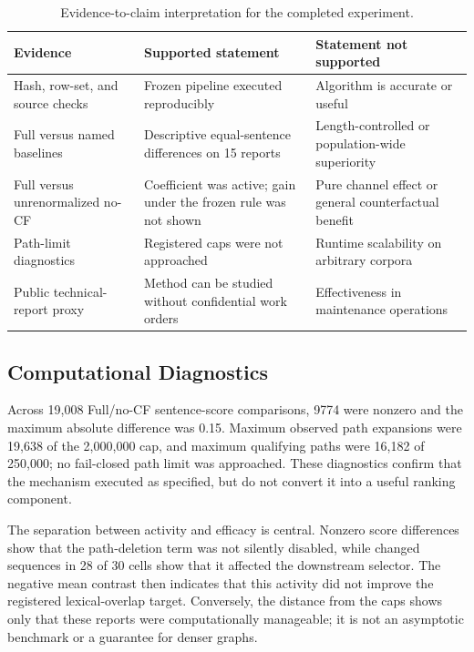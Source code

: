 \documentclass[applsci,article,submit,moreauthors]{Definitions/mdpi}
\begin{document}
\begin{table}[H]
\caption{Evidence-to-claim interpretation for the completed experiment.}
\label{tab:evidence-matrix}\centering\small
\begin{tabular}{p{}p{}p{}}
\toprule
Evidence & Supported statement & Statement not supported\\
\midrule
Hash, row-set, and source checks & Frozen pipeline executed reproducibly & Algorithm is accurate or useful\\
Full versus named baselines & Descriptive equal-sentence differences on 15 reports & Length-controlled or population-wide superiority\\
Full versus unrenormalized no-CF & Coefficient was active; gain under the frozen rule was not shown & Pure channel effect or general counterfactual benefit\\
Path-limit diagnostics & Registered caps were not approached & Runtime scalability on arbitrary corpora\\
Public technical-report proxy & Method can be studied without confidential work orders & Effectiveness in maintenance operations\\
\bottomrule
\end{tabular}
\end{table}

\subsection{Computational Diagnostics}

Across 19,008 Full/no-CF sentence-score comparisons, 9774 were nonzero and the maximum absolute difference was 0.15. Maximum observed path expansions were 19,638 of the 2,000,000 cap, and maximum qualifying paths were 16,182 of 250,000; no fail-closed path limit was approached. These diagnostics confirm that the mechanism executed as specified, but do not convert it into a useful ranking component.

The separation between activity and efficacy is central. Nonzero score differences show that the path-deletion term was not silently disabled, while changed sequences in 28 of 30 cells show that it affected the downstream selector. The negative mean contrast then indicates that this activity did not improve the registered lexical-overlap target. Conversely, the distance from the caps shows only that these reports were computationally manageable; it is not an asymptotic benchmark or a guarantee for denser graphs.
\end{document}
